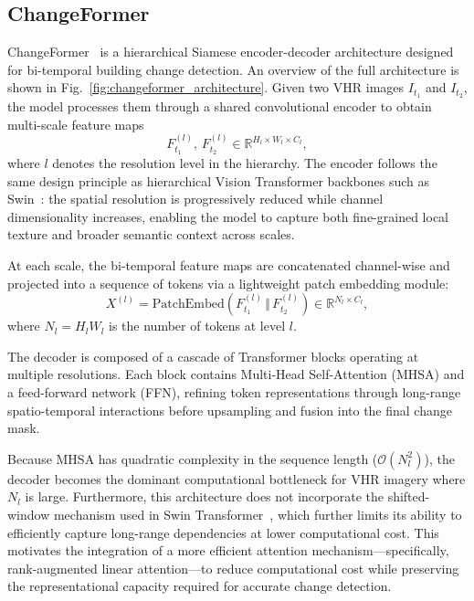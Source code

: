 \documentclass[runningheads]{llncs}
\begin{document}
\subsection{ChangeFormer}
\label{subsec:cf_overview}

ChangeFormer~\cite{Bandara2022ChangeFormer} is a hierarchical Siamese
encoder-decoder architecture designed for bi-temporal building change detection.
An overview of the full architecture is shown in
Fig.~\ref{fig:changeformer_architecture}. Given two VHR images $I_{t_1}$ and
$I_{t_2}$, the model processes them through a shared convolutional encoder to
obtain multi-scale feature maps
\begin{equation}
F_{t_1}^{(l)},\, F_{t_2}^{(l)} \in \mathbb{R}^{H_l \times W_l \times C_l},
\end{equation}
where $l$ denotes the resolution level in the hierarchy. The encoder follows
the same design principle as hierarchical Vision Transformer backbones such as
Swin~\cite{Teng2023SwinCD}: the spatial resolution is progressively reduced
while channel dimensionality increases, enabling the model to capture both
fine-grained local texture and broader semantic context across scales.

At each scale, the bi-temporal feature maps are concatenated channel-wise and
projected into a sequence of tokens via a lightweight patch embedding module:
\begin{equation}
X^{(l)} = \mathrm{PatchEmbed}\!\left(F_{t_1}^{(l)} \,\Vert\, F_{t_2}^{(l)}\right)
      \in \mathbb{R}^{N_l \times C_l},
\end{equation}
where $N_l = H_lW_l$ is the number of tokens at level $l$.

The decoder is composed of a cascade of Transformer blocks operating at
multiple resolutions. Each block contains Multi-Head Self-Attention (MHSA) and
a feed-forward network (FFN), refining token representations through long-range
spatio-temporal interactions before upsampling and fusion into the final change
mask.

Because MHSA has quadratic complexity in the sequence length
($\mathcal{O}(N_l^2)$), the decoder becomes the dominant computational
bottleneck for VHR imagery where $N_l$ is large. Furthermore, this
architecture does not incorporate the shifted-window mechanism used in Swin
Transformer~\cite{Teng2023SwinCD}, which further limits its ability to
efficiently capture long-range dependencies at lower computational cost. This
motivates the integration of a more efficient attention mechanism—specifically,
rank-augmented linear attention—to reduce computational cost while preserving
the representational capacity required for accurate change detection.
\end{document}

